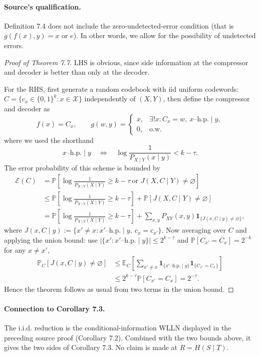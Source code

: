 \documentclass[UTF8,11pt,a4paper]{ctexart}
\theoremstyle{definition}\newtheorem*{definition}{Definition}
\theoremstyle{remark}\newtheorem*{remark}{Remark}
\newcommand{\E}{\mathbb E}
\newcommand{\Prob}{\mathbb P}
\begin{document}
\paragraph{Source's qualification.}
Definition 7.4 does not include the zero-undetected-error condition (that is $g(f(x),y)=x$ or $e$). In other words, we allow for the possibility of undetected errors.
\begin{proof}[Proof of Theorem 7.7]
LHS is obvious, since side information at the compressor and decoder is better than only at the decoder.

For the RHS, first generate a random codebook with iid uniform codewords:
$C=\{c_x\in\{0,1\}^k:x\in\mathcal X\}$ independently of $(X,Y)$, then define the compressor and decoder as
\[
f(x)=C_x,\qquad
 g(w,y)=\begin{cases}x,&\exists!x:C_x=w,\ x\text{--h.p.}\mid y,\\0,&\text{o.w.}\end{cases}
\]
where we used the shorthand
\[
x\text{--h.p.}\mid y\quad\Longleftrightarrow\quad
\log\frac1{P_{X\mid Y}(x\mid y)}<k-\tau.
\]
The error probability of this scheme is bounded by
\begin{align*}
\mathcal E(C)
&=\Prob\left[\log\frac1{P_{X\mid Y}(X\mid Y)}\ge k-\tau
\ \text{or }J(X,C\mid Y)\ne\varnothing\right]\\
&\le\Prob\left[\log\frac1{P_{X\mid Y}(X\mid Y)}\ge k-\tau\right]
+\Prob[J(X,C\mid Y)\ne\varnothing]\\
&=\Prob\left[\log\frac1{P_{X\mid Y}(X\mid Y)}\ge k-\tau\right]
+\sum_{x,y}P_{XY}(x,y)\mathbf1_{\{J(x,C\mid y)\ne\varnothing\}},
\end{align*}
where $J(x,C\mid y)\mathrel{:=}\{x'\ne x:x'\text{--h.p.}\mid y,\ c_x=c_{x'}\}$.
Now averaging over $C$ and applying the union bound: use
$|\{x':x'\text{--h.p.}\mid y\}|\le2^{k-\tau}$ and
$\Prob[C_{x'}=C_x]=2^{-k}$ for any $x\ne x'$,
\begin{align*}
\Prob_C[J(x,C\mid y)\ne\varnothing]
&\le\E_C\left[\sum_{x'\ne x}
\mathbf1_{\{x'\text{--h.p.}\mid y\}}\mathbf1_{\{C_{x'}=C_x\}}\right]\\
&\le2^{k-\tau}\Prob[C_{x'}=C_x]=2^{-\tau}.
\end{align*}
Hence the theorem follows as usual from two terms in the union bound.
\end{proof}
\paragraph{Connection to Corollary 7.3.}
The i.i.d. reduction is the conditional-information WLLN displayed in the preceding source proof (Corollary 7.2). Combined with the two bounds above, it gives the two sides of Corollary 7.3. No claim is made at $R=H(S\mid T)$.
\end{document}
